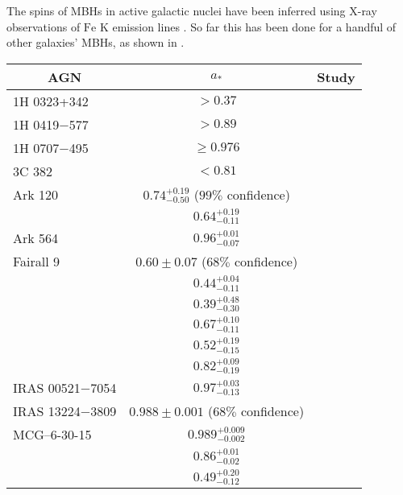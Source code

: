 {The spins of MBHs in active galactic nuclei have been inferred using X-ray observations of $\mathrm{Fe}$ $\mathrm{K}$ emission lines \citep{Miller2007, McClintock2011}. So far this has been done for a handful of other galaxies' MBHs, as shown in .
\begin{table}[htp]
\centering
\begin{tabular}{l c l }
\toprule
\multicolumn{1}{c}{AGN} & \multicolumn{1}{c}{$a_\ast$} & \multicolumn{1}{c}{Study} \\ \midrule 
1H 0323+342 & $>0.37$ & \citet{Walton2013} \\ %
1H 0419$-$577 & $>0.89$ & \citet{Walton2013} \\ %
1H 0707$-$495 & $\geq 0.976$ & \citet{Zoghbi2010} \\ %
3C 382	& $<0.81$ & \citet{Walton2013} \\ %
Ark 120 & $0.74^{+0.19}_{-0.50}$ ($99\%$ confidence) & \citet{Nardini2011} \\ %
 & $0.64^{+0.19}_{-0.11}$ & \citet{Walton2013} \\ %
Ark 564 & $0.96^{+0.01}_{-0.07}$ & \citet{Walton2013} \\ %
Fairall 9 & $0.60 \pm 0.07$ ($68\%$ confidence) & \citet{Schmoll2009} \\ %
 & $0.44^{+0.04}_{-0.11}$ & \citet{Patrick2011} \\ %
 & $0.39^{+0.48}_{-0.30}$ & \citet{Emmanoulopoulos2011} \\ %
 & $0.67^{+0.10}_{-0.11}$ & \citet{Patrick2011a} \\ %
 & $0.52^{+0.19}_{-0.15}$ & \citet{Lohfink2012} \\ %
 & $0.82^{+0.09}_{-0.19}$ & \citet{Walton2013} \\ %
IRAS 00521$-$7054 & $0.97^{+0.03}_{-0.13}$ & \citet{Tan2012} \\ %
IRAS 13224$-$3809 & $0.988 \pm 0.001$ ($68\%$ confidence) & \citet{Fabian2013} \\ %
MCG--6-30-15 & $0.989^{+0.009}_{-0.002}$ & \citet{Brenneman2006} \\ %
 & $0.86^{+0.01}_{-0.02}$ & \citet{delaCallePerez2010} \\ %
 & $0.49^{+0.20}_{-0.12}$ & \citet{Patrick2011a} \\ %

\end{tabular}
\end{table}}
